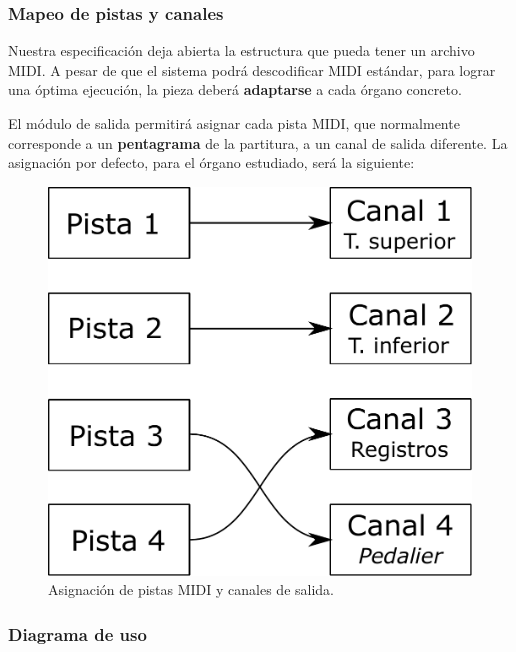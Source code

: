 \subsubsection{Mapeo de pistas y canales}

Nuestra especificación deja abierta la estructura que pueda tener un archivo \acrshort{MIDI}. A pesar de que el sistema podrá descodificar \acrshort{MIDI} estándar, para lograr una óptima ejecución, la pieza deberá \textbf{adaptarse} a cada órgano concreto.

El módulo de salida permitirá asignar cada pista \acrshort{MIDI}, que normalmente corresponde a un \textbf{pentagrama} de la partitura, a un canal de salida diferente. La asignación por defecto, para el órgano estudiado, será la siguiente:

\smallskip

\begin{figure}[H]
	\noindent \begin{centering}
		\includegraphics[width=\linewidth/3]{capitulo4/map}
		\par\end{centering}
	\smallskip
	\caption{\label{fig:map} Asignación de pistas MIDI y canales de salida.}
\end{figure} 

\smallskip

\subsubsection{Diagrama de uso}

